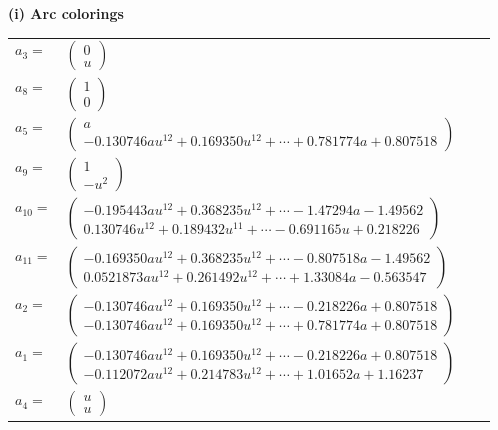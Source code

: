 \documentclass[1p]{elsarticle_modified}
\theoremstyle{definition}
\begin{document}
\flushleft \textbf{(i) Arc colorings}\\
\begin{tabular}{m{7pt} m{180pt} m{7pt} m{180pt} }
\flushright $a_{3}=$&$\begin{pmatrix}0\\u\end{pmatrix}$ \\
\flushright $a_{8}=$&$\begin{pmatrix}1\\0\end{pmatrix}$ \\
\flushright $a_{5}=$&$\begin{pmatrix}a\\-0.130746 a u^{12}+0.169350 u^{12}+\cdots+0.781774 a+0.807518\end{pmatrix}$ \\
\flushright $a_{9}=$&$\begin{pmatrix}1\\- u^2\end{pmatrix}$ \\
\flushright $a_{10}=$&$\begin{pmatrix}-0.195443 a u^{12}+0.368235 u^{12}+\cdots-1.47294 a-1.49562\\0.130746 u^{12}+0.189432 u^{11}+\cdots-0.691165 u+0.218226\end{pmatrix}$ \\
\flushright $a_{11}=$&$\begin{pmatrix}-0.169350 a u^{12}+0.368235 u^{12}+\cdots-0.807518 a-1.49562\\0.0521873 a u^{12}+0.261492 u^{12}+\cdots+1.33084 a-0.563547\end{pmatrix}$ \\
\flushright $a_{2}=$&$\begin{pmatrix}-0.130746 a u^{12}+0.169350 u^{12}+\cdots-0.218226 a+0.807518\\-0.130746 a u^{12}+0.169350 u^{12}+\cdots+0.781774 a+0.807518\end{pmatrix}$ \\
\flushright $a_{1}=$&$\begin{pmatrix}-0.130746 a u^{12}+0.169350 u^{12}+\cdots-0.218226 a+0.807518\\-0.112072 a u^{12}+0.214783 u^{12}+\cdots+1.01652 a+1.16237\end{pmatrix}$ \\
\flushright $a_{4}=$&$\begin{pmatrix}u\\u\end{pmatrix}$ \\

\end{tabular}
\end{document}
